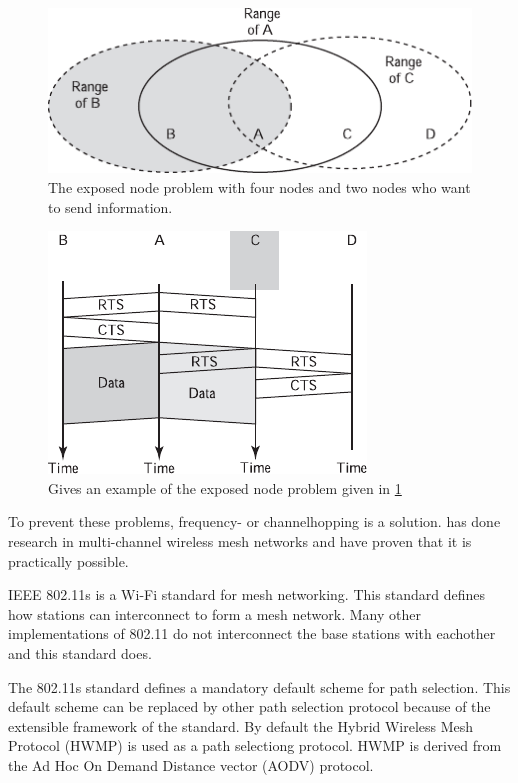 \documentclass[10pt,a4paper]{article}
\begin{document}
\begin{figure}[H]
   \centering
   \includegraphics[width=1\textwidth]{exposedstation}
   \caption{The exposed node problem with four nodes and two nodes who want to send information.}
   \label{fig:exposedstation}
\end{figure}

\begin{figure}[H]
   \centering
   \includegraphics[width=.75\textwidth]{rtscts2}
   \caption{Gives an example of the exposed node problem given in \ref{fig:exposedstation}}
   \label{fig:rtscts2}
\end{figure}

To prevent these problems, frequency- or channelhopping is a solution. \cite{architectureandalgorithmsmultichannelwirelessmeshnetwork} has done research in multi-channel wireless mesh networks and have proven that it is practically possible.

IEEE 802.11s is a Wi-Fi standard for mesh networking. This standard defines how stations can interconnect to form a mesh network. Many other implementations of 802.11 do not interconnect the base stations with eachother and this standard does. \cite{ieee80211sthewlanmeshstandard}

The 802.11s standard defines a mandatory default scheme for path selection. This default scheme can be replaced by other path selection protocol because of the extensible framework of the standard. By default the Hybrid Wireless Mesh Protocol (HWMP) is used as a path selectiong protocol. HWMP is derived from the Ad Hoc On Demand Distance vector (AODV) protocol. \cite{ieee80211sthewlanmeshstandard}
\end{document}
